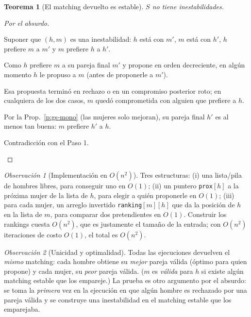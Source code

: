 \documentclass[11pt,a4paper]{article}
\theoremstyle{plain}
\newtheorem{teorema}{Teorema}[section]
\theoremstyle{definition}
\theoremstyle{remark}
\newtheorem*{observacion}{Observación}
\begin{document}
\begin{teorema}[El matching devuelto es estable]
$S$ no tiene inestabilidades.
\end{teorema}
\begin{proof}[Por el absurdo]
\begin{pasos}
\item Suponer que $(h,m)$ es una inestabilidad: $h$ está con $m'$, $m$ está con $h'$,
$h$ prefiere $m$ a $m'$ y $m$ prefiere $h$ a $h'$.
\item Como $h$ prefiere $m$ a su pareja final $m'$ y propone en orden decreciente, en
algún momento $h$ le propuso a $m$ (antes de proponerle a $m'$).
\item Esa propuesta terminó en rechazo o en un compromiso posterior roto; en cualquiera
de los dos casos, $m$ quedó comprometida con alguien que prefiere a $h$.
\item Por la Prop.~\ref{p:gs-mono} (las mujeres solo mejoran), su pareja final $h'$ es
al menos tan buena: $m$ prefiere $h'$ a $h$.
\item Contradicción con el Paso 1. \qedhere
\end{pasos}
\end{proof}

\begin{observacion}[Implementación en $O(n^2)$]
Tres estructuras: (i) una lista/pila de hombres libres, para conseguir uno en $O(1)$;
(ii) un puntero \texttt{prox}$[h]$ a la próxima mujer de la lista de $h$, para elegir a
quién proponerle en $O(1)$; (iii) para cada mujer, un arreglo invertido
\texttt{ranking}$[m][h]$ que da la posición de $h$ en la lista de $m$, para comparar dos
pretendientes en $O(1)$. Construir los rankings cuesta $O(n^2)$, que es justamente el
tamaño de la entrada; con $O(n^2)$ iteraciones de costo $O(1)$, el total es $O(n^2)$.
\end{observacion}

\begin{observacion}[Unicidad y optimalidad]
Todas las ejecuciones devuelven el \emph{mismo} matching: cada hombre obtiene su
\emph{mejor} pareja válida (óptimo para quien propone) y cada mujer, su \emph{peor}
pareja válida. ($m$ es \emph{válida} para $h$ si existe algún matching estable que los
empareje.) La prueba es otro argumento por el absurdo: se toma la \emph{primera} vez en
la ejecución en que algún hombre es rechazado por una pareja válida y se construye una
inestabilidad en el matching estable que los emparejaba.
\end{observacion}
\end{document}
